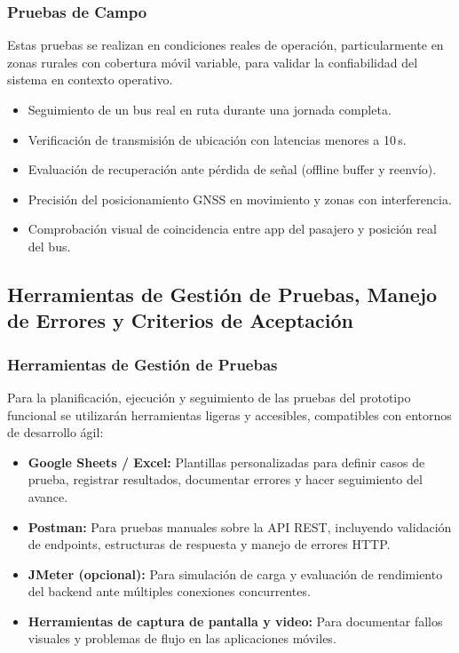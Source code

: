 \documentclass[12pt]{article}
\begin{document}
\subsubsection*{Pruebas de Campo}

Estas pruebas se realizan en condiciones reales de operación, particularmente en zonas rurales con cobertura móvil variable, para validar la confiabilidad del sistema en contexto operativo.

\begin{itemize}
    \item Seguimiento de un bus real en ruta durante una jornada completa.
    \item Verificación de transmisión de ubicación con latencias menores a 10\,s.
    \item Evaluación de recuperación ante pérdida de señal (offline buffer y reenvío).
    \item Precisión del posicionamiento GNSS en movimiento y zonas con interferencia.
    \item Comprobación visual de coincidencia entre app del pasajero y posición real del bus.
\end{itemize}
\newpage
\subsection{Herramientas de Gestión de Pruebas, Manejo de Errores y Criterios de Aceptación}\label{subsec:herramientas_errores_criterios}

\subsubsection*{Herramientas de Gestión de Pruebas}

Para la planificación, ejecución y seguimiento de las pruebas del prototipo funcional se utilizarán herramientas ligeras y accesibles, compatibles con entornos de desarrollo ágil:

\begin{itemize}
    \item \textbf{Google Sheets / Excel:} Plantillas personalizadas para definir casos de prueba, registrar resultados, documentar errores y hacer seguimiento del avance.
    \item \textbf{Postman:} Para pruebas manuales sobre la API REST, incluyendo validación de endpoints, estructuras de respuesta y manejo de errores HTTP.
    \item \textbf{JMeter (opcional):} Para simulación de carga y evaluación de rendimiento del backend ante múltiples conexiones concurrentes.
    \item \textbf{Herramientas de captura de pantalla y video:} Para documentar fallos visuales y problemas de flujo en las aplicaciones móviles.
\end{itemize}
\end{document}
